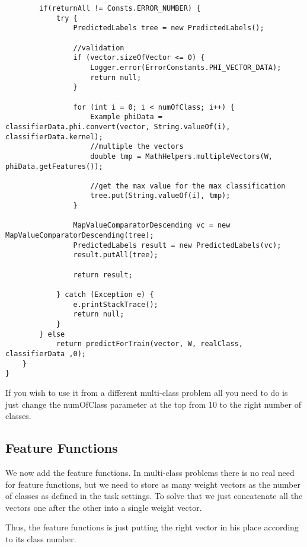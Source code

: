 \documentclass[11pt, oneside]{article}   	%
\begin{document}
\begin{lstlisting}
        if(returnAll != Consts.ERROR_NUMBER) {
            try {
                PredictedLabels tree = new PredictedLabels();

                //validation
                if (vector.sizeOfVector <= 0) {
                    Logger.error(ErrorConstants.PHI_VECTOR_DATA);
                    return null;
                }

                for (int i = 0; i < numOfClass; i++) {
                    Example phiData = classifierData.phi.convert(vector, String.valueOf(i), classifierData.kernel);
                    //multiple the vectors
                    double tmp = MathHelpers.multipleVectors(W, phiData.getFeatures());

                    //get the max value for the max classification
                    tree.put(String.valueOf(i), tmp);
                }

                MapValueComparatorDescending vc = new MapValueComparatorDescending(tree);
                PredictedLabels result = new PredictedLabels(vc);
                result.putAll(tree);

                return result;

            } catch (Exception e) {
                e.printStackTrace();
                return null;
            }
        } else
            return predictForTrain(vector, W, realClass, classifierData ,0);
    }
}
\end{lstlisting}

If you wish to use it from a different multi-class problem all you need to do is just change the numOfClass parameter at the top from 10 to the right number of classes.

\subsection{Feature Functions}
We now add the feature functions. In multi-class problems there is no real need for feature functions, but we need to store as many weight vectors as the number of classes as defined in the task settings. To solve that we just concatenate all the vectors one after the other into a single weight vector.

Thus, the feature functions is just putting the right vector in his place according to its class number. 
\end{document}
